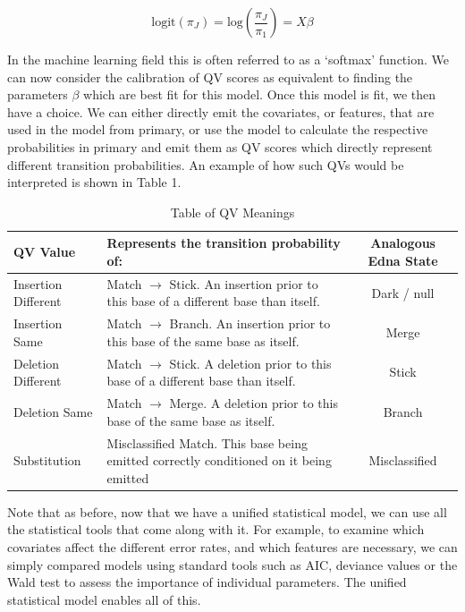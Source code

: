 \documentclass[fleqn,10pt]{SelfArx} %
\begin{document}
\begin{dmath}
\text{logit} (\pi_{J}) = \text{log} ( \frac{\pi_{J}}{\pi_{1}}) = X \beta
\end{dmath}

In the machine learning field this is often referred to as a `softmax' function.  We can now consider the calibration of QV scores as equivalent to finding the parameters $\beta$ which are best fit for this model.  Once this model is fit, we then have a choice.  We can either directly emit the covariates, or features, that are used in the model from primary, or use the model to calculate the respective probabilities in primary and emit them as QV scores which directly represent different transition probabilities.  An example of how such QVs would be interpreted is shown in Table 1.  

\begin{table}[bt]
\caption{Table of QV Meanings}
\centering
    \begin{tabular}{| l | p{7cm} | c |  }
    \toprule
    \hline
    \textbf{QV Value} &  \textbf{Represents the transition probability of:} &   \textbf{Analogous Edna State}  \\ \hline \hline
    Insertion Different & Match $\rightarrow$ Stick.  An insertion prior to this base of a different base than itself. &  Dark / null \\ \hline
    Insertion Same & Match $\rightarrow$ Branch. An insertion prior to this base of the same base as itself.&  Merge \\ \hline
    Deletion Different & Match $\rightarrow$ Stick. A deletion prior to this base of a different base than itself. &  Stick \\ \hline
    Deletion Same & Match $\rightarrow$ Merge. A deletion prior to this base of the same base as itself. &  Branch \\ \hline
    Substitution & Misclassified Match. This base being emitted correctly conditioned on it being emitted &   Misclassified \\ \hline
    \bottomrule
    \end{tabular}
\end{table}

Note that as before, now that we have a unified statistical model, we can use all the statistical tools that come along with it.  For example, to examine which covariates affect the different error rates, and which features are necessary, we can simply compared models using standard tools such as AIC, deviance values or the Wald test to assess the importance of individual parameters.  The unified statistical model enables all of this.
\end{document}
